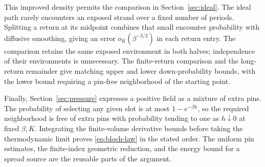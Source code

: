 This improved density permits the comparison in
Section~\ref{sec:ideal}. The ideal path rarely encounters an exposed
strand over a fixed number of periods. Splitting a return at its
midpoint combines that small encounter probability with diffusive
smoothing, giving an error $o_K(\beta^{-3/2})$ in each return entry.
The comparison retains the same exposed environment in both halves;
independence of their environments is unnecessary. The finite-return
comparison and the long-return remainder give matching upper and
lower down-probability bounds, with the lower bound requiring a
pin-free neighborhood of the starting point.

Finally, Section~\ref{sec:pressure} expresses a positive field as a
mixture of extra pins. The probability of selecting any given slot
is at most $1-e^{-\beta h}$, so the required neighborhood is free of
extra pins with probability tending to one as $h\downarrow0$ at fixed
$\beta,K$. Integrating the finite-volume derivative bounds before
taking the thermodynamic limit proves \eqref{eq:bloch-law} in the
stated order. The uniform pin estimates, the finite-index geometric
reduction, and the energy bound for a spread source are the reusable
parts of the argument.
